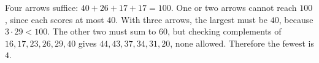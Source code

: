 Four arrows suffice: $40+26+17+17=100$. One or two arrows cannot reach $100$, since each scores at most $40$. With three arrows, the largest must be $40$, because $3\cdot29<100$. The other two must sum to $60$, but checking complements of $16,17,23,26,29,40$ gives $44,43,37,34,31,20$, none allowed. Therefore the fewest is $\boxed4$.
